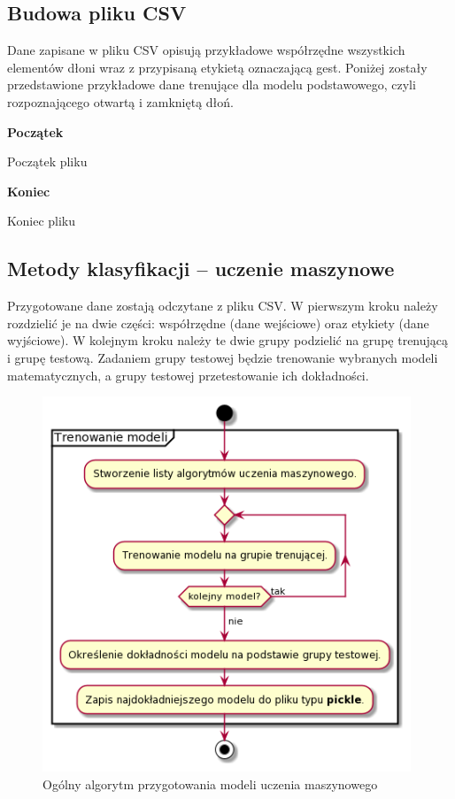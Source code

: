 \subsection{Budowa pliku CSV}
\quad Dane zapisane w pliku CSV opisują przykładowe współrzędne wszystkich elementów dłoni wraz z przypisaną etykietą oznaczającą gest. Poniżej zostały przedstawione przykładowe dane trenujące dla modelu podstawowego, czyli rozpoznającego otwartą i zamkniętą dłoń. \newline

\textbf{Początek}\newline

\begin{table}[H]
\centering
{} 
\caption{Początek pliku}
\end{table}

\textbf{Koniec}\newline

\begin{table}[H]
\centering
{} 
\caption{Koniec pliku}
\end{table}

\newpage
\subsection{Metody klasyfikacji -- uczenie maszynowe}

\quad Przygotowane dane zostają odczytane z pliku CSV. W pierwszym kroku należy rozdzielić je na dwie części: współrzędne (dane wejściowe) oraz etykiety (dane wyjściowe). W kolejnym kroku należy te dwie grupy podzielić na grupę trenującą i grupę testową. Zadaniem grupy testowej będzie trenowanie wybranych modeli matematycznych, a grupy testowej przetestowanie ich dokładności. 

\begin{figure}[H]
    \begin{center}
        \includegraphics[width=11cm]{../images/train_models.png}
        \caption{Ogólny algorytm przygotowania modeli uczenia maszynowego}
    \end{center}
\end{figure}

